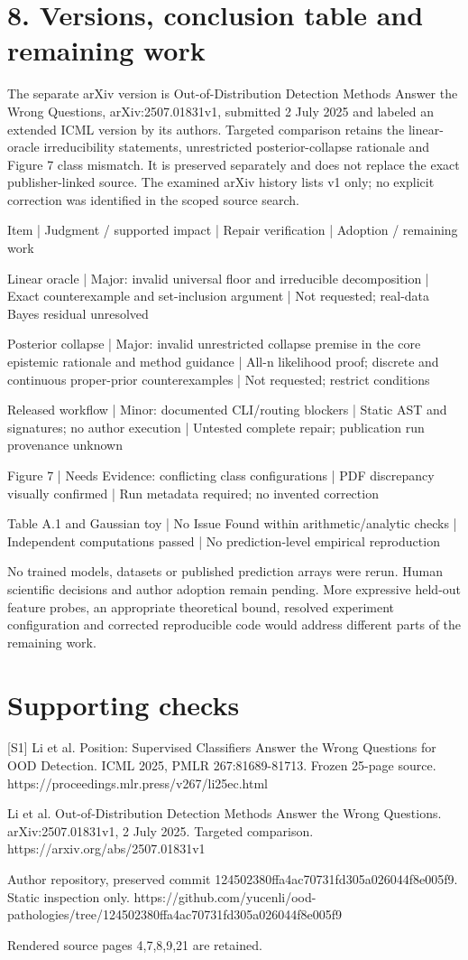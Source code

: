 \documentclass[10pt]{article}
\begin{document}
\section*{8. Versions, conclusion table and remaining work}
The separate arXiv version is Out-of-Distribution Detection Methods Answer the Wrong Questions, arXiv:2507.01831v1, submitted 2 July 2025 and labeled an extended ICML version by its authors. Targeted comparison retains the linear-oracle irreducibility statements, unrestricted posterior-collapse rationale and Figure 7 class mismatch. It is preserved separately and does not replace the exact publisher-linked source. The examined arXiv history lists v1 only; no explicit correction was identified in the scoped source search.\par
Item | Judgment / supported impact | Repair verification | Adoption / remaining work\par
Linear oracle | Major: invalid universal floor and irreducible decomposition | Exact counterexample and set-inclusion argument | Not requested; real-data Bayes residual unresolved\par
Posterior collapse | Major: invalid unrestricted collapse premise in the core epistemic rationale and method guidance | All-n likelihood proof; discrete and continuous proper-prior counterexamples | Not requested; restrict conditions\par
Released workflow | Minor: documented CLI/routing blockers | Static AST and signatures; no author execution | Untested complete repair; publication run provenance unknown\par
Figure 7 | Needs Evidence: conflicting class configurations | PDF discrepancy visually confirmed | Run metadata required; no invented correction\par
Table A.1 and Gaussian toy | No Issue Found within arithmetic/analytic checks | Independent computations passed | No prediction-level empirical reproduction\par
No trained models, datasets or published prediction arrays were rerun. Human scientific decisions and author adoption remain pending. More expressive held-out feature probes, an appropriate theoretical bound, resolved experiment configuration and corrected reproducible code would address different parts of the remaining work.\par
\section*{Supporting checks}
[S1] Li et al. Position: Supervised Classifiers Answer the Wrong Questions for OOD Detection. ICML 2025, PMLR 267:81689-81713. Frozen 25-page source. https://proceedings.mlr.press/v267/li25ec.html\par
Li et al. Out-of-Distribution Detection Methods Answer the Wrong Questions. arXiv:2507.01831v1, 2 July 2025. Targeted comparison. https://arxiv.org/abs/2507.01831v1\par
Author repository, preserved commit 124502380ffa4ac70731fd305a026044f8e005f9. Static inspection only. https://github.com/yucenli/ood-pathologies/tree/124502380ffa4ac70731fd305a026044f8e005f9\par
Rendered source pages 4,7,8,9,21 are retained.\par
\end{document}
